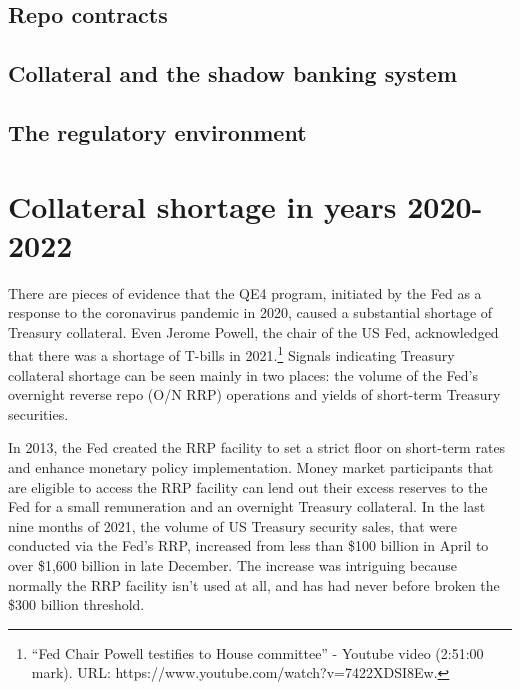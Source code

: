 \documentclass[11pt,a4paper,english,oneside]{article}
\begin{document}
\subsection{Repo contracts}


\subsection{Collateral and the shadow banking system}


\subsection{The regulatory environment}


\newpage

\section{Collateral shortage in years 2020-2022} \label{sec:shortage}%

There are pieces of evidence that the QE4 program, initiated by the Fed as a response to the coronavirus pandemic in 2020, caused a substantial shortage of Treasury collateral. Even Jerome Powell, the chair of the US Fed, acknowledged that there was a shortage of T-bills in 2021.\footnote{“Fed Chair Powell testifies to House committee” - Youtube video (2:51:00 mark). URL: https://www.youtube.com/watch?v=7422XDSI8Ew.} Signals indicating Treasury collateral shortage can be seen mainly in two places: the volume of the Fed's overnight reverse repo (O/N RRP) operations and yields of short-term Treasury securities.

In 2013, the Fed created the RRP facility to set a strict floor on short-term rates and enhance monetary policy implementation. Money market participants that are eligible to access the RRP facility can lend out their excess reserves to the Fed for a small remuneration and an overnight Treasury collateral. In the last nine months of 2021, the volume of US Treasury security sales, that were conducted via the Fed's RRP, increased from less than \$100 billion in April to over \$1,600 billion in late December. The increase was intriguing because normally the RRP facility isn't used at all, and has had never before broken the \$300 billion threshold.
\end{document}
